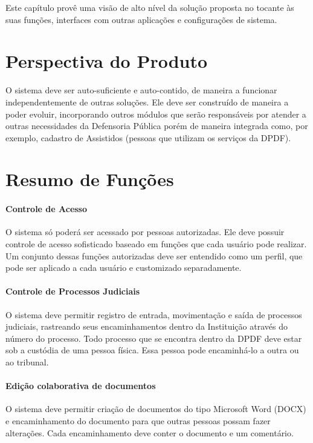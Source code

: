 \documentclass[12pt,a4paper]{report}
\begin{document}
Este capítulo provê uma visão de alto nível da solução proposta no tocante às suas funções, interfaces com outras aplicações e configurações de sistema.

\section{Perspectiva do Produto}

O sistema deve ser auto-suficiente e auto-contido, de maneira a funcionar independentemente de outras soluções. Ele deve ser construído de maneira a poder evoluir, incorporando outros módulos que serão responsáveis por atender a outras necessidades da Defensoria Pública porém de maneira integrada como, por exemplo, cadastro de Assistidos (pessoas que utilizam os serviços da DPDF).

\section{Resumo de Funções}

\paragraph{Controle de Acesso} O sistema só poderá ser acessado por pessoas autorizadas. Ele deve possuir controle de acesso sofisticado baseado em funções que cada usuário pode realizar. Um conjunto dessas funções autorizadas deve ser entendido como um perfil, que pode ser aplicado a cada usuário e customizado separadamente.

\paragraph{Controle de Processos Judiciais} O sistema deve permitir registro de entrada, movimentação e saída de processos judiciais, rastreando seus encaminhamentos dentro da Instituição através do número do processo. Todo processo que se encontra dentro da DPDF deve estar sob a custódia de uma pessoa física. Essa pessoa pode encaminhá-lo a outra ou ao tribunal.

\paragraph{Edição colaborativa de documentos} O sistema deve permitir criação de documentos do tipo Microsoft Word (DOCX) e encaminhamento do documento para que outras pessoas possam fazer alterações. Cada encaminhamento deve conter o documento e um comentário.
\end{document}
